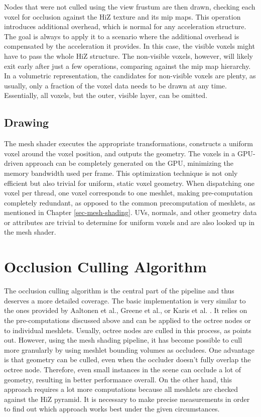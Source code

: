 \noindent
Nodes that were not culled using the view frustum are then drawn, checking each voxel for occlusion against the 
\ac{HiZ} texture and its mip maps. This operation introduces additional overhead, which is normal for any acceleration structure. 
The goal is always to apply it to a scenario where the additional overhead is compensated by the acceleration it provides. 
In this case, the visible voxels might have to pass the whole \ac{HiZ} structure. The non-visible voxels, however, will likely 
exit early after just a few operations, comparing against the mip map hierarchy. In a volumetric representation, the candidates 
for non-visible voxels are plenty, as usually, only a fraction of the voxel data needs to be drawn at any time. Essentially, 
all voxels, but the outer, visible layer, can be omitted.

\subsection*{Drawing} \label{subsec-mesh-shader}

The mesh shader executes the appropriate transformations, constructs a uniform voxel around the voxel position, 
and outputs the geometry. The voxels in a \ac{GPU}-driven approach can be completely generated on the \ac{GPU}, 
minimizing the memory bandwidth used per frame. This optimization technique is not only efficient but also 
trivial for uniform, static voxel geometry. When dispatching one voxel per thread, one voxel corresponds 
to one meshlet, making pre-computation completely redundant, as opposed to the common precomputation of meshlets, 
as mentioned in Chapter \ref{sec-mesh-shading}. UVs, normals, and other geometry data or attributes are 
trivial to determine for uniform voxels and are also looked up in the mesh shader.


\section{Occlusion Culling Algorithm} \label{sec-occlusion}

The occlusion culling algorithm is the central part of the pipeline and thus deserves a more detailed coverage. The 
basic implementation is very similar to the ones provided by Aaltonen et al., Greene et al., or Karis et al. 
\cite{Aaltonen2015,Greene93,Karis2021}. It relies on the pre-computations discussed above and can be applied to the 
octree nodes or to individual meshlets. Usually, octree nodes are culled in this process, as \cite{AkenineMoeller2018}
points out. However, using the mesh shading pipeline, it has become possible to cull more granularly by using 
meshlet bounding volumes as occludees. One advantage is that geometry can be culled, even when the occluder doesn't 
fully overlap the octree node. Therefore, even small instances in the scene can occlude a lot of geometry, resulting 
in better performance overall. On the other hand, this approach requires a lot more computations because all meshlets 
are checked against the \ac{HiZ} pyramid. It is necessary to make precise measurements in order to find out which 
approach works best under the given circumstances.


